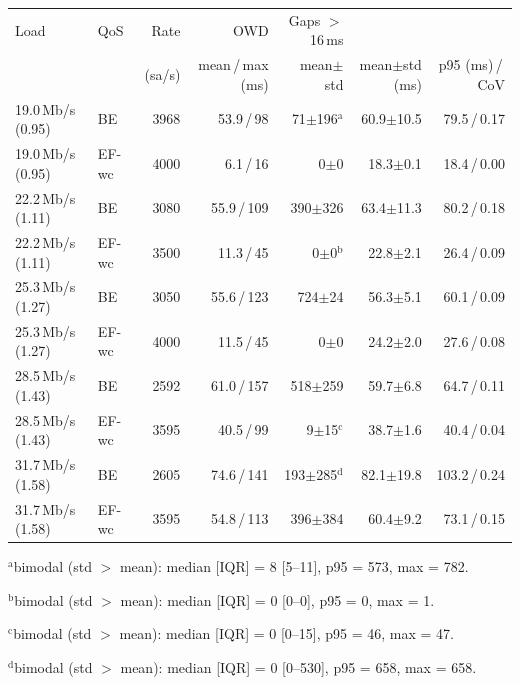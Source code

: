 \begin{tabular}{llrrrrr}
\toprule
Load & QoS & Rate & OWD & Gaps $>$16\,ms & \ttrip{} & \ttrip{} \\
 & & (sa/s) & mean\,/\,max (ms) & mean$\pm$std & mean$\pm$std (ms) & p95 (ms)\,/\,CoV \\
\midrule
19.0\,Mb/s (0.95) & BE & 3968 & 53.9\,/\,98 & 71$\pm$196$^{\mathrm{a}}$ & 60.9$\pm$10.5 & 79.5\,/\,0.17 \\
19.0\,Mb/s (0.95) & EF-wc & 4000 & 6.1\,/\,16 & 0$\pm$0 & 18.3$\pm$0.1 & 18.4\,/\,0.00 \\
22.2\,Mb/s (1.11) & BE & 3080 & 55.9\,/\,109 & 390$\pm$326 & 63.4$\pm$11.3 & 80.2\,/\,0.18 \\
22.2\,Mb/s (1.11) & EF-wc & 3500 & 11.3\,/\,45 & 0$\pm$0$^{\mathrm{b}}$ & 22.8$\pm$2.1 & 26.4\,/\,0.09 \\
25.3\,Mb/s (1.27) & BE & 3050 & 55.6\,/\,123 & 724$\pm$24 & 56.3$\pm$5.1 & 60.1\,/\,0.09 \\
25.3\,Mb/s (1.27) & EF-wc & 4000 & 11.5\,/\,45 & 0$\pm$0 & 24.2$\pm$2.0 & 27.6\,/\,0.08 \\
28.5\,Mb/s (1.43) & BE & 2592 & 61.0\,/\,157 & 518$\pm$259 & 59.7$\pm$6.8 & 64.7\,/\,0.11 \\
28.5\,Mb/s (1.43) & EF-wc & 3595 & 40.5\,/\,99 & 9$\pm$15$^{\mathrm{c}}$ & 38.7$\pm$1.6 & 40.4\,/\,0.04 \\
31.7\,Mb/s (1.58) & BE & 2605 & 74.6\,/\,141 & 193$\pm$285$^{\mathrm{d}}$ & 82.1$\pm$19.8 & 103.2\,/\,0.24 \\
31.7\,Mb/s (1.58) & EF-wc & 3595 & 54.8\,/\,113 & 396$\pm$384 & 60.4$\pm$9.2 & 73.1\,/\,0.15 \\
\bottomrule
\end{tabular}
\par\smallskip\footnotesize $^{\mathrm{a}}$bimodal (std $>$ mean): median [IQR] = 8 [5--11], p95 = 573, max = 782.
\par\smallskip\footnotesize $^{\mathrm{b}}$bimodal (std $>$ mean): median [IQR] = 0 [0--0], p95 = 0, max = 1.
\par\smallskip\footnotesize $^{\mathrm{c}}$bimodal (std $>$ mean): median [IQR] = 0 [0--15], p95 = 46, max = 47.
\par\smallskip\footnotesize $^{\mathrm{d}}$bimodal (std $>$ mean): median [IQR] = 0 [0--530], p95 = 658, max = 658.
